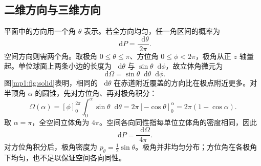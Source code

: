 \documentclass[11pt,openany,fontset=fandol]{ctexbook}
\theoremstyle{definition}\newtheorem{example}{例}[chapter]\newtheorem{exercise}{习题}[chapter]
\newcommand{\dd}{\mathop{}\!\mathrm d}\newcommand{\ee}{\mathrm e}\newcommand{\vct}[1]{\bm{#1}}
\begin{document}
\subsection{二维方向与三维方向}
平面中的方向用一个角 $\theta$ 表示。若全方向均匀，任一角区间的概率为
\[
\dd P=\frac{\dd\theta}{2\pi}.
\]
空间方向则需两个角。取极角 $0\le\theta\le\pi$、方位角 $0\le\phi<2\pi$，极角从正 $z$ 轴量起。单位球面上两条小边的长度为 $\dd\theta$ 与 $\sin\theta\dd\phi$，故立体角微元为
\begin{equation}\label{mp1:eq:solid-angle}
\dd\Omega=\sin\theta\dd\theta\dd\phi.
\end{equation}
图\ref{mp1:fig:solid}表明，相同的 $\dd\theta$ 在赤道附近覆盖的方向比在极点附近更多。对半顶角 $\alpha$ 的圆锥，先对方位角、再对极角积分：
\[
\Omega(\alpha)=[\phi]_0^{2\pi}\int_0^\alpha\sin\theta\dd\theta
=2\pi[-\cos\theta]_0^\alpha=2\pi(1-\cos\alpha).
\]
取 $\alpha=\pi$，全空间立体角为 $4\pi$。空间各向同性指每单位立体角的密度相同，因此
\[
\dd P=\frac{\dd\Omega}{4\pi}.
\]
对方位角积分后，极角密度为 $p_\theta=\tfrac12\sin\theta$。极角并非均匀分布；方位角在各极角下均匀，也不足以保证空间各向同性。
\end{document}
